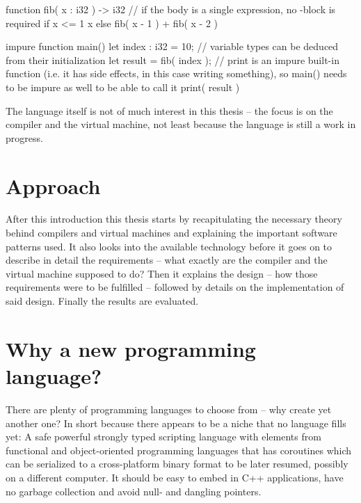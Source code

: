 	\begin{perseuslisting}[caption={Desired target language example},label={lst:target_language}]
function fib( x : i32 ) -> i32
    // if the body is a single expression, no {}-block is required
    if x <= 1
        x
    else
        fib( x - 1 ) + fib( x - 2 )

impure function main()
{
	let index : i32 = 10;
	// variable types can be deduced from their initialization
	let result = fib( index );
	// print is an impure built-in function (i.e. it has side effects, in this case writing something), so main() needs to be impure as well to be able to call it
	print( result )
}
	\end{perseuslisting}
	
	The language itself is not of much interest in this thesis -- the focus is on the compiler and the virtual machine, not least because the language is still a work in progress.
    
    
	\section{Approach} %
	
	After this introduction this thesis starts by recapitulating the necessary theory behind compilers and virtual machines and explaining the important software patterns used. It also looks into the available technology before it goes on to describe in detail the requirements -- what exactly are the compiler and the virtual machine supposed to do? Then it explains the design -- how those requirements were to be fulfilled -- followed by details on the implementation of said design. Finally the results are evaluated.
	
	
	\section{Why a new programming language?}
	
	There are plenty of programming languages to choose from -- why create yet another one? In short because there appears to be a niche that no language fills yet: A safe powerful strongly typed scripting language with elements from functional and object-oriented programming languages that has coroutines which can be serialized to a cross-platform binary format to be later resumed, possibly on a different computer. It should be easy to embed in C++ applications, have no garbage collection and avoid null- and dangling pointers.
	
